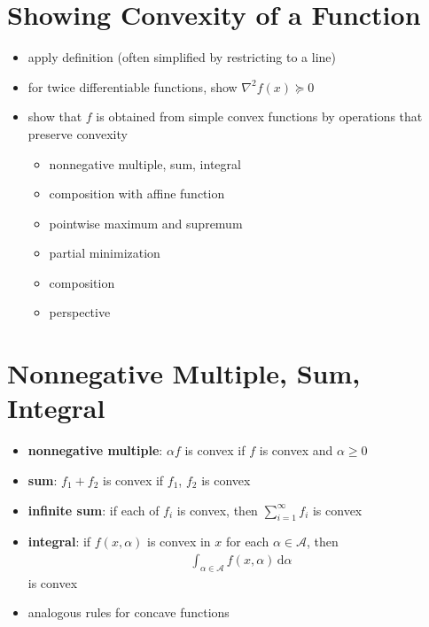 \documentclass[11pt]{extarticle}
\newcommand{\ds}{\displaystyle}
\theoremstyle{definition}
\begin{document}
\newpage

\section*{Showing Convexity of a Function}

\begin{itemize}
  \item apply definition (often simplified by restricting to a line)
  \item for twice differentiable functions, show $\ds\nabla^2 f(x)\succcurlyeq 0$
  \item show that $f$ is obtained from simple convex functions by operations that preserve convexity
    \begin{itemize}
      \item nonnegative multiple, sum, integral
      \item composition with affine function
      \item pointwise maximum and supremum
      \item partial minimization
      \item composition
      \item perspective
    \end{itemize}
\end{itemize}

\newpage

\section*{Nonnegative Multiple, Sum, Integral}
\begin{itemize}
  \item {\bf nonnegative multiple}: $\alpha f$ is convex if $f$ is convex and $\alpha\geqslant 0$
  \item {\bf sum}: $f_1 + f_2$ is convex if $f_1$, $f_2$ is convex
  \item {\bf infinite sum}: if each of $\ds f_i$ is convex, then $\ds\sum_{i = 1}^\infty f_i$ is convex
  \item {\bf integral}: if $\ds f(x, \alpha)$ is convex in $x$ for each $\alpha\in\mathcal{A}$, then 
    \begin{align*}
      \int_{\alpha\in\mathcal{A}}f(x,\alpha)\,\text{d}\alpha
    \end{align*} 
    is convex
  \item analogous rules for concave functions
\end{itemize}
\end{document}
